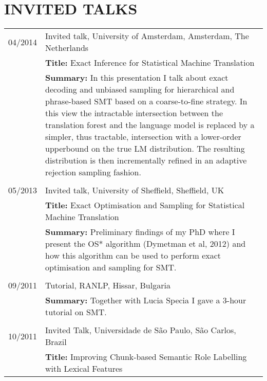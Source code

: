 
\section*{INVITED TALKS}

\begin{tabular}{p{2cm}  p{13.92cm}}
04/2014 & Invited talk, University of Amsterdam, Amsterdam, The Netherlands \\
        & {\bf Title:} Exact Inference for Statistical Machine Translation \\
        & {\bf Summary:} In this presentation I talk about exact decoding and unbiased sampling for hierarchical and phrase-based SMT based on a coarse-to-fine strategy. In this view the intractable intersection between the translation forest and the language model is replaced by a simpler, thus tractable, intersection with a lower-order upperbound on the true LM distribution. The resulting distribution is then incrementally refined in an adaptive rejection sampling fashion.  \\
        & \\
05/2013 & Invited talk, University of Sheffield, Sheffield, UK \\
        & {\bf Title:} Exact Optimisation and Sampling for Statistical Machine Translation \\
        & {\bf Summary:} Preliminary findings of my PhD where I present the OS* algorithm (Dymetman et al, 2012) and how this algorithm can be used to perform exact optimisation and sampling for SMT. \\
        & \\
09/2011	& Tutorial, RANLP, Hissar, Bulgaria \\
	& {\bf Summary:} Together with Lucia Specia I gave a 3-hour tutorial on SMT. \\
	& \\
10/2011	& Invited Talk, Universidade de S\~ao Paulo, S\~ao Carlos, Brazil \\
	& {\bf Title:} Improving Chunk-based Semantic Role Labelling with Lexical Features \\

\end{tabular}
